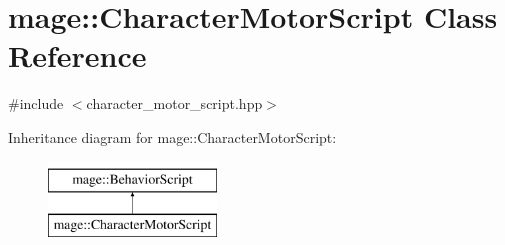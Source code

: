 \hypertarget{classmage_1_1_character_motor_script}{}\section{mage\+:\+:Character\+Motor\+Script Class Reference}
\label{classmage_1_1_character_motor_script}


{\ttfamily \#include $<$character\+\_\+motor\+\_\+script.\+hpp$>$}

Inheritance diagram for mage\+:\+:Character\+Motor\+Script\+:\begin{figure}[H]
\begin{center}
\leavevmode
\includegraphics[height=2.000000cm]{classmage_1_1_character_motor_script}
\end{center}
\end{figure}
